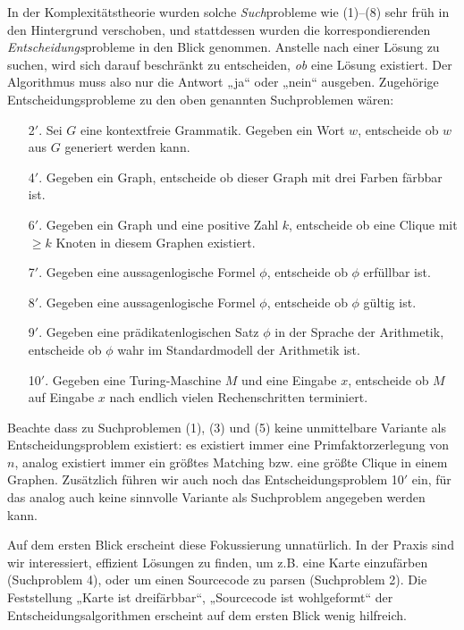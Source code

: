 In der Komplexitätstheorie wurden solche \emph{Such}probleme wie (1)--(8) sehr früh in den Hintergrund verschoben, und stattdessen wurden die korrespondierenden \emph{Entscheidungs}probleme in den Blick genommen. Anstelle nach einer Lösung zu suchen, wird sich darauf beschränkt zu entscheiden, \emph{ob} eine Lösung existiert. Der Algorithmus muss also nur die Antwort „ja“ oder „nein“ ausgeben. Zugehörige Entscheidungsprobleme zu den oben genannten Suchproblemen wären:
\begin{enumerate}
    \item[2$'$.] Sei $G$ eine kontextfreie Grammatik. Gegeben ein Wort $w$, entscheide ob $w$ aus $G$ generiert werden kann.
    \item[4$'$.] Gegeben ein Graph, entscheide ob dieser Graph mit drei Farben färbbar ist.
    \item[6$'$.] Gegeben ein Graph und eine positive Zahl $k$, entscheide ob eine Clique mit $\geq k$ Knoten in diesem Graphen existiert.
    \item[7$'$.] Gegeben eine aussagenlogische Formel $\phi$, entscheide ob $\phi$ erfüllbar ist.
    \item[8$'$.] Gegeben eine aussagenlogische Formel $\phi$, entscheide ob $\phi$ gültig ist.
    \item[9$'$.] Gegeben eine prädikatenlogischen Satz $\phi$ in der Sprache der Arithmetik, entscheide ob $\phi$ wahr im Standardmodell der Arithmetik ist.
    \item[10$'$.] Gegeben eine Turing-Maschine $M$ und eine Eingabe $x$, entscheide ob $M$ auf Eingabe $x$ nach endlich vielen Rechenschritten terminiert.
\end{enumerate}
Beachte dass zu Suchproblemen (1), (3) und (5) keine unmittelbare Variante als Entscheidungsproblem existiert: es existiert immer eine Primfaktorzerlegung von $n$, analog existiert immer ein größtes Matching bzw. eine größte Clique in einem Graphen.
Zusätzlich führen wir auch noch das Entscheidungsproblem 10$'$ ein, für das analog auch keine sinnvolle Variante als Suchproblem angegeben werden kann.

Auf dem ersten Blick erscheint diese Fokussierung unnatürlich. In der Praxis sind wir interessiert, effizient Lösungen zu finden, um z.B. eine Karte einzufärben (Suchproblem 4), oder um einen Sourcecode zu parsen (Suchproblem 2). Die Feststellung „Karte ist dreifärbbar“, „Sourcecode ist wohlgeformt“ der Entscheidungsalgorithmen erscheint auf dem ersten Blick wenig hilfreich.

